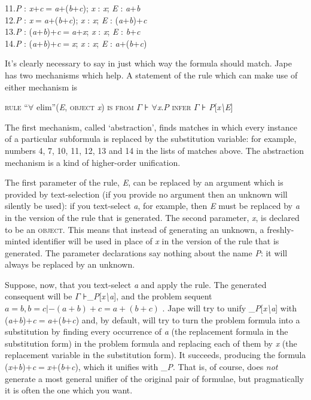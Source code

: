 \documentclass[11pt]{book}
\newcommand{\tab}{\hspace{5mm}}
\begin{document}
11.\tab \textit{P} : \textit{x}+\textit{c}\ensuremath{=}\textit{a}+(\textit{b}+\textit{c}); \textit{x} : \textit{x}; \textit{E} : \textit{a}+\textit{b}\\
12.\tab \textit{P} : \textit{x}\ensuremath{=}\textit{a}+(\textit{b}+\textit{c}); \textit{x} : \textit{x}; \textit{E} : (\textit{a}+\textit{b})+\textit{c}\\
13.\tab \textit{P} : (\textit{a}+\textit{b})+\textit{c}\ensuremath{=}\textit{a}+\textit{x}; \textit{x} : \textit{x}; \textit{E} : \textit{b}+\textit{c}\\
14.\tab \textit{P} : (\textit{a}+\textit{b})+\textit{c}\ensuremath{=}\textit{x}; \textit{x} : \textit{x}; \textit{E} : \textit{a}+(\textit{b}+\textit{c})


It's clearly necessary to say in just which way the formula should match. Jape has two mechanisms which help. A statement of the rule which can make use of either mechanism is


\textsc{rule ``}\ensuremath{\forall} elim''(\textit{E}, \textsc{object} \textit{x}) \textsc{is from} \ensuremath{\Gamma} ⊦ \ensuremath{\forall}\textit{x}.\textit{P} \textsc{infer} \ensuremath{\Gamma} ⊦ \textit{P}[\textit{x{\textbackslash}E}]


The first mechanism, called `abstraction', finds matches in which every instance of a particular subformula is replaced by the substitution variable: for example, numbers 4, 7, 10, 11, 12, 13 and 14 in the lists of matches above. The abstraction mechanism is a kind of higher-order unification.


The first parameter of the rule, \textit{E}, can be replaced by an argument which is provided by text-selection (if you provide no argument then an unknown will silently be used): if you text-select \textit{a}, for example, then \textit{E} must be replaced by \textit{a} in the version of the rule that is generated. The second parameter, \textit{x}, is declared to be an \textsc{object}. This means that instead of generating an unknown, a freshly-minted identifier will be used in place of \textit{x} in the version of the rule that is generated. The parameter declarations say nothing about the name \textit{P}: it will always be replaced by an unknown.


Suppose, now, that you text-select \textit{a} and apply the rule. The generated consequent will be \ensuremath{\Gamma} ⊦\_\textit{P}[\textit{x{\textbackslash}a}], and the problem sequent $a=b,b=c |- (a+b)+c=a+(b+c)$ . Jape will try to unify \_\textit{P}[\textit{x{\textbackslash}a}] with (\textit{a}+\textit{b})+\textit{c}\ensuremath{=}\textit{a}+(\textit{b}+\textit{c}) and, by default, will try to turn the problem formula into a substitution by finding every occurrence of \textit{a} (the replacement formula in the substitution form) in the problem formula and replacing each of them by \textit{x} (the replacement variable in the substitution form). It succeeds, producing the formula (\textit{x}+\textit{b})+\textit{c}\ensuremath{=}\textit{x}+(\textit{b}+\textit{c}), which it unifies with \_\textit{P}. That is, of course, does \textit{not} generate a most general unifier of the original pair of formulae, but pragmatically it is often the one which you want.
\end{document}
